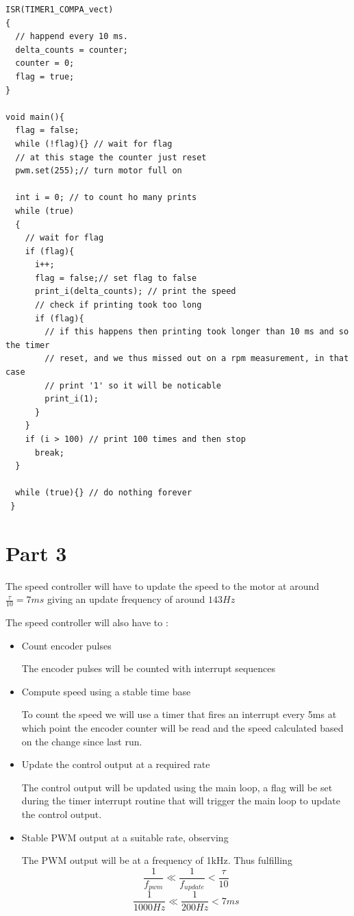 \documentclass{article}
\begin{document}
\begin{lstlisting}[caption=The relevant lines from the code used when measuring the motor response]
ISR(TIMER1_COMPA_vect)
{
  // happend every 10 ms.
  delta_counts = counter;
  counter = 0;
  flag = true;
}

void main(){
  flag = false;
  while (!flag){} // wait for flag
  // at this stage the counter just reset 
  pwm.set(255);// turn motor full on
  
  int i = 0; // to count ho many prints
  while (true)
  {
    // wait for flag
    if (flag){
      i++;
      flag = false;// set flag to false
      print_i(delta_counts); // print the speed
      // check if printing took too long
      if (flag){
        // if this happens then printing took longer than 10 ms and so the timer
        // reset, and we thus missed out on a rpm measurement, in that case
        // print '1' so it will be noticable
        print_i(1);
      }
    }
    if (i > 100) // print 100 times and then stop
      break;
  }
 
  while (true){} // do nothing forever
 }
\end{lstlisting}

\section*{Part 3}
The speed controller will have to update the speed to the motor at around $\frac{\tau}{10} = 7 ms$ giving an update frequency of around $143 Hz$

The speed controller will also have to :

\begin{itemize}
    \item Count encoder pulses
    \begin{description}
    The encoder pulses will be counted with interrupt sequences 
    \end{description}
    \item Compute speed using a stable time base
    \begin{description}
    To count the speed we will use a timer that fires an interrupt every 5ms at which point the encoder counter will be read and the speed calculated based on the change since last run.
    \end{description}
    \item Update the control output at a required rate
    \begin{description}
    The control output will be updated using the main loop, a flag will be set during the timer interrupt routine that will trigger the main loop to update the control output.
    \end{description}
    \item Stable PWM output at a suitable rate, observing
    \begin{description}
    The PWM output will be at a frequency of 1kHz. Thus fulfilling 
    \[ \frac{1}{f_{pwm}} \ll  \frac{1}{f_{update}} < \frac{\tau}{10}\]
    \[ \frac{1}{1000Hz} \ll \frac{1}{200Hz} < 7ms \]
    \end{description}

\end{itemize}
\end{document}
